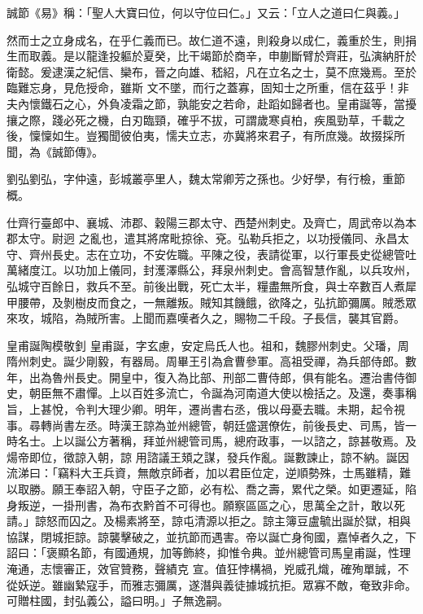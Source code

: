 
\begin{pinyinscope}

 誠節《易》稱：「聖人大寶曰位，何以守位曰仁。」又云：「立人之道曰仁與義。」



 然而士之立身成名，在乎仁義而已。故仁道不遠，則殺身以成仁，義重於生，則捐生而取義。是以龍逢投軀於夏癸，比干竭節於商辛，申蒯斷臂於齊莊，弘演納肝於衛懿。爰逮漢之紀信、欒布，晉之向雄、嵇紹，凡在立名之士，莫不庶幾焉。至於臨難忘身，見危授命，雖斯
 文不墜，而行之蓋寡，固知士之所重，信在茲乎！非夫內懷鐵石之心，外負凌霜之節，孰能安之若命，赴蹈如歸者也。皇甫誕等，當擾攘之際，踐必死之機，白刃臨頸，確乎不拔，可謂歲寒貞柏，疾風勁草，千載之後，懍懍如生。豈獨聞彼伯夷，懦夫立志，亦冀將來君子，有所庶幾。故掇採所聞，為《誠節傳》。



 劉弘劉弘，字仲遠，彭城叢亭里人，魏太常卿芳之孫也。少好學，有行檢，重節概。



 仕齊行臺郎中、襄城、沛郡、穀陽三郡太守、西楚州刺史。及齊亡，周武帝以為本郡太守。尉迥
 之亂也，遣其將席毗掠徐、兗。弘勒兵拒之，以功授儀同、永昌太守、齊州長史。志在立功，不安佐職。平陳之役，表請從軍，以行軍長史從總管吐萬緒度江。以功加上儀同，封濩澤縣公，拜泉州刺史。會高智慧作亂，以兵攻州，弘城守百餘日，救兵不至。前後出戰，死亡太半，糧盡無所食，與士卒數百人煮犀甲腰帶，及剝樹皮而食之，一無離叛。賊知其饑餓，欲降之，弘抗節彌厲。賊悉眾來攻，城陷，為賊所害。上聞而嘉嘆者久之，賜物二千段。子長信，襲其官爵。



 皇甫誕陶模敬釗
 皇甫誕，字玄慮，安定烏氏人也。祖和，魏膠州刺史。父璠，周隋州刺史。誕少剛毅，有器局。周畢王引為倉曹參軍。高祖受禪，為兵部侍郎。數年，出為魯州長史。開皇中，復入為比部、刑部二曹侍郎，俱有能名。遷治書侍御史，朝臣無不肅憚。上以百姓多流亡，令誕為河南道大使以檢括之。及還，奏事稱旨，上甚悅，令判大理少卿。明年，遷尚書右丞，俄以母憂去職。未期，起令視事。尋轉尚書左丞。時漢王諒為並州總管，朝廷盛選僚佐，前後長史、司馬，皆一時名士。上以誕公方著稱，拜並州總管司馬，總府政事，一以諮之，諒甚敬焉。及煬帝即位，徵諒入朝，諒
 用諮議王頍之謀，發兵作亂。誕數諫止，諒不納。誕因流涕曰：「竊料大王兵資，無敵京師者，加以君臣位定，逆順勢殊，士馬雖精，難以取勝。願王奉詔入朝，守臣子之節，必有松、喬之壽，累代之榮。如更遷延，陷身叛逆，一掛刑書，為布衣黔首不可得也。願察區區之心，思萬全之計，敢以死請。」諒怒而囚之。及楊素將至，諒屯清源以拒之。諒主簿豆盧毓出誕於獄，相與協謀，閉城拒諒。諒襲擊破之，並抗節而遇害。帝以誕亡身徇國，嘉悼者久之，下詔曰：「褒顯名節，有國通規，加等飾終，抑惟令典。並州總管司馬皇甫誕，性理淹通，志懷審正，效官贊務，聲績克
 宣。值狂悖構禍，兇威孔熾，確殉單誠，不從妖逆。雖幽縶寇手，而雅志彌厲，遂潛與義徒據城抗拒。眾寡不敵，奄致非命。可贈柱國，封弘義公，謚曰明。」子無逸嗣。




\end{pinyinscope}
